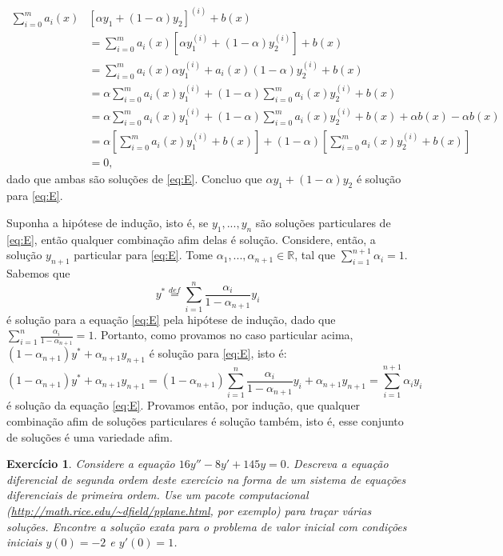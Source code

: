 \documentclass[a4paper,12pt]{article}
\theoremstyle{exer}
\newtheorem{exercise}{Exercício}
\theoremstyle{definition}
\begin{document}
\begin{equation}
    \begin{split}
        \sum_{i = 0}^m a_i(x)&[\alpha y_1 + (1 - \alpha)y_2]^{(i)} + b(x) \\
        &= \sum_{i = 0}^m a_i(x)[\alpha y_1^{(i)} + (1 - \alpha)y_2^{(i)}] + b(x) \\
        &= \sum_{i = 0}^m a_i(x)\alpha y_1^{(i)} + a_i(x)(1 - \alpha)y_2^{(i)} + b(x) \\
        &= \alpha\sum_{i = 0}^m a_i(x)y_1^{(i)} + (1 - \alpha)\sum_{i = 0}^m a_i(x)y_2^{(i)} + b(x) \\
        &= \alpha\sum_{i = 0}^m a_i(x)y_1^{(i)} + (1 - \alpha)\sum_{i = 0}^m a_i(x)y_2^{(i)} + b(x) + \alpha b(x) - \alpha b(x) \\
        &= \alpha\left[\sum_{i = 0}^m a_i(x)y_1^{(i)} + b(x)\right] + (1 - \alpha)\left[\sum_{i = 0}^m a_i(x)y_2^{(i)} + b(x)\right] \\
        &= 0,  
\end{split}
\end{equation}
dado que ambas são soluções de \eqref{eq:E}. Concluo que $\alpha y_1 + (1 -
\alpha)y_2$ é solução para \eqref{eq:E}. 

Suponha a hipótese de indução, isto é, se $y_1, ..., y_n$ são soluções
particulares de \eqref{eq:E}, então qualquer combinação afim delas é solução.
Considere, então, a solução $y_{n+1}$ particular para \eqref{eq:E}. Tome
$\alpha_1, ..., \alpha_{n+1} \in \mathbb{R}$, tal que $\sum_{i=1}^{n+1}
\alpha_i = 1$. Sabemos que $$y^* \overset{def}{=} \sum_{i=1}^{n} \frac{\alpha_i}{1 - \alpha_{n+1}}
y_i$$ 
é solução para a equação \eqref{eq:E} pela hipótese de indução, dado que 
$\sum_{i=1}^n \frac{\alpha_i}{1 - \alpha_{n+1}} = 1$. Portanto, como provamos no caso particular acima,  $(1 - \alpha_{n+1}) y^{*} + \alpha_{n+1}y_{n+1}$ é solução para \eqref{eq:E}, isto é: 
$$
(1 - \alpha_{n+1}) y^{*} + \alpha_{n+1}y_{n+1} = (1 - \alpha_{n+1})\sum_{i=1}^{n} \frac{\alpha_i}{1 - \alpha_{n+1}} y_i + \alpha_{n + 1}y_{n+1} = \sum_{i=1}^{n+1} \alpha_i y_i 
$$
é solução da equação \eqref{eq:E}. Provamos então, por indução, que qualquer combinação afim de soluções particulares é solução também, isto é, esse conjunto de soluções é uma variedade afim.

\begin{exercise}
    Considere a equação $16y'' - 8y' + 145y = 0$.  Descreva a equação diferencial de segunda
    ordem deste exercício na forma de um sistema de equações diferenciais de primeira ordem.
    Use um pacote computacional (\url{http://math.rice.edu/~dfield/pplane.html}, por exemplo) para
    traçar várias soluções. Encontre a solução exata para o problema de valor inicial com
    condições iniciais $y(0) = -2$ e $y'(0) = 1$. 
\end{exercise}
\end{document}
